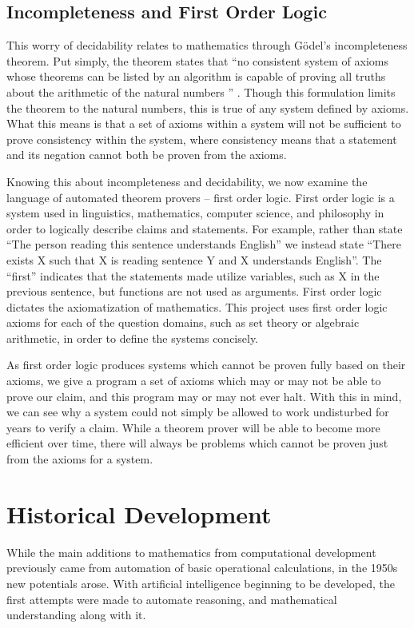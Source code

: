 \subsection{Incompleteness and First Order Logic}
This worry of decidability relates to mathematics through G\"odel's incompleteness theorem. Put simply, the theorem states that ``no consistent system of axioms whose theorems can be listed by an algorithm is capable of proving all truths about the arithmetic of the natural numbers '' \cite{Godel}. Though this formulation limits the theorem to the natural numbers, this is true of any system defined by axioms. What this means is that a set of axioms within a system will not be sufficient to prove consistency within the system, where consistency means that a statement and its negation cannot both be proven from the axioms.

Knowing this about incompleteness and decidability, we now examine the language of automated theorem provers -- first order logic. First order logic is a system used in linguistics, mathematics, computer science, and philosophy in order to logically describe claims and statements. For example, rather than state ``The person reading this sentence understands English'' we instead state ``There exists X such that X is reading sentence Y and X understands English''. The ``first'' indicates that the statements made utilize variables, such as X in the previous sentence, but functions are not used as arguments. First order logic dictates the axiomatization of mathematics. This project uses first order logic axioms for each of the question domains, such as set theory or algebraic arithmetic, in order to define the systems concisely.

As first order logic produces systems which cannot be proven fully based on their axioms, we give a program a set of axioms which may or may not be able to prove our claim, and this program may or may not ever halt. With this in mind, we can see why a system could not simply be allowed to work undisturbed for years to verify a claim. While a theorem prover will be able to become more efficient over time, there will always be problems which cannot be proven just from the axioms for a system.

\section{Historical Development}

While the main additions to mathematics from computational development previously came from automation of basic operational calculations, in the 1950s new potentials arose. With artificial intelligence beginning to be developed, the first attempts were made to automate reasoning, and mathematical understanding along with it.

